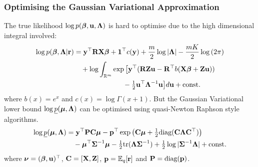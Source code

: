 \documentclass{beamer}
\begin{document}
	\begin{frame}
		\frametitle{Optimising the Gaussian Variational Approximation}
		The true likelihood $\log p({\boldsymbol \beta}, {\bf u}, {\boldsymbol \Lambda})$ is hard to optimise due 
		to the high dimensional integral involved:
		\begin{align*}
			\log p({\boldsymbol \beta}, {\boldsymbol \Lambda} | {\bf r}) & = {\bf y}^\top {\bf R} {\bf X} {\boldsymbol\beta} + {\bf 1}^\top c({\bf y}) + \frac{m}{2} \log |{\boldsymbol \Lambda}| - \frac{mK}{2} \log{(2 \pi)}      \\
			                              & \quad + \log  \int_{\mathbb{R}^{m}} \exp \big[ {\bf y}^\top ({\bf R} {\bf Z} {\bf u} - {\bf R}^\top b( {\bf X} {\boldsymbol \beta} + {\bf Z} {\bf u}))   \\
			                              & \quad \quad \quad \quad \quad \quad \quad - \tfrac{1}{2} {{\bf u}^\top {\boldsymbol\Lambda}^{-1} {\bf u} } \big] d {\bf u} + \text{const.} 
		\end{align*}
		where $b(x) = e^x$ and $c(x) = \log \Gamma(x + 1)$. But the Gaussian Variational lower bound $\log
		\underline{p}({\boldsymbol \mu}, {\boldsymbol \Lambda})$ can be optimised using quasi-Newton Raphson style algorithms.
		\begin{align*}		                                   
			\log \underline{p}({\boldsymbol \mu}, {\boldsymbol \Lambda}) & = {\bf y}^\top {\bf P} {\bf C} {\boldsymbol\mu} - {\bf p}^\top \exp{\left({\bf C}{\boldsymbol\mu}+  \tfrac{1}{2} \text{diag}{({\bf C}{\boldsymbol\Lambda}{\bf C}^\top)}\right)}                         \\
			                                   & \quad - {\boldsymbol \mu}^\top {\boldsymbol\Sigma}^{-1} {\boldsymbol \mu} - \tfrac{1}{2} \text{tr}{({\boldsymbol\Lambda}{\boldsymbol\Sigma}^{-1})} + \tfrac{1}{2} \log{|{\boldsymbol\Sigma}^{-1}{\boldsymbol\Lambda}|} + \text{const.} 
		\end{align*}
		where ${\boldsymbol \nu} = ({\boldsymbol \beta}, {\bf u})^\top$, ${\bf C} = [{\bf X}, {\bf Z}]$, ${\bf p} = \mathbb{E}_q[{\bf r}]$ and ${\bf P} = \text{diag}({\bf p})$.
	\end{frame}
		
	\def\checkmark{\tikz\fill[scale=0.4](0,.35) -- (.25,0) -- (1,.7) -- (.25,.15) -- cycle;}
		
\end{document}
